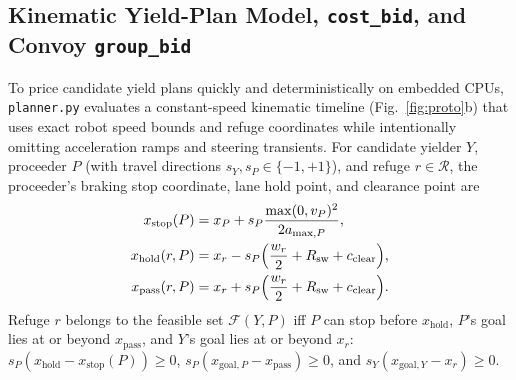 \documentclass[letterpaper,journal]{IEEEtran}
\newcommand{\cb}{\texttt{cost\_bid}}
\newcommand{\gb}{\texttt{group\_bid}}
\begin{document}
\subsection{Kinematic Yield-Plan Model, \cb, and Convoy \gb}
To price candidate yield plans quickly and deterministically on embedded CPUs, \texttt{planner.py} evaluates a constant-speed kinematic timeline (Fig.~\ref{fig:proto}b) that uses exact robot speed bounds and refuge coordinates while intentionally omitting acceleration ramps and steering transients. For candidate yielder $Y$, proceeder $P$ (with travel directions $s_Y,s_P\in\{-1,+1\}$), and refuge $r\in\mathcal{R}$, the proceeder's braking stop coordinate, lane hold point, and clearance point are
\begin{equation}
\begin{aligned}
x_{\mathrm{stop}}(P) &= x_P + s_P \frac{\max(0, v_P)^2}{2 a_{\max,P}}, \\
x_{\mathrm{hold}}(r, P) &= x_r - s_P \Bigl(\frac{w_r}{2} + R_{\mathrm{sw}} + c_{\mathrm{clear}}\Bigr), \\
x_{\mathrm{pass}}(r, P) &= x_r + s_P \Bigl(\frac{w_r}{2} + R_{\mathrm{sw}} + c_{\mathrm{clear}}\Bigr).
\end{aligned}
\label{eq:geom}
\end{equation}
Refuge $r$ belongs to the feasible set $\mathcal{F}(Y,P)$ iff $P$ can stop before $x_{\mathrm{hold}}$, $P$'s goal lies at or beyond $x_{\mathrm{pass}}$, and $Y$'s goal lies at or beyond $x_r$: $s_P(x_{\mathrm{hold}}-x_{\mathrm{stop}}(P))\ge 0$, $s_P(x_{\mathrm{goal},P}-x_{\mathrm{pass}})\ge 0$, and $s_Y(x_{\mathrm{goal},Y}-x_r)\ge 0$.
\end{document}
